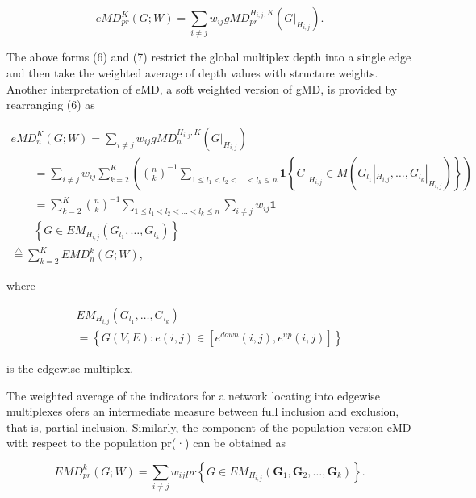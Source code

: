 \documentclass[
  10
]{article}
\begin{document}
\[
e M D _ {p r} ^ {K} (G; W) = \sum_ {i \neq j} w _ {i j} g M D _ {p r} ^ {H _ {i, j}, K} (G | _ {H _ {i, j}}).\tag{7}
\]

The above forms (6) and (7) restrict the global multiplex depth into a
single edge and then take the weighted average of depth values with
structure weights. Another interpretation of eMD, a soft weighted
version of gMD, is provided by rearranging (6) as

\[
\begin{array}{l} e M D _ {n} ^ {K} (G; W) = \sum_ {i \neq j} w _ {i j}   g M D _ {n} ^ {H _ {i, j}, K} (G   | _ {H _ {i, j}}) \\ \qquad = \sum_ {i \neq j} w _ {i j} \sum_ {k = 2} ^ {K} \left(\binom {n} {k} ^ {- 1} \sum_ {1 \leq l _ {1} <   l _ {2} <   \dots <   l _ {k} \leq n} \mathbf {1} \left\{G | _ {H _ {i, j}} \in M \left(G _ {l _ {1}} | _ {H _ {i, j}}, \dots , G _ {l _ {k}} | _ {H _ {i, j}}\right) \right\}\right) \\ \qquad = \sum_ {k = 2} ^ {K} \binom {n} {k} ^ {- 1} \sum_ {1 \leq l _ {1} <   l _ {2} <   \dots <   l _ {k} \leq n} \sum_ {i \neq j} w _ {i j} \mathbf {1} \\ \qquad \left\{G \in E M _ {H _ {i, j}} \left(G _ {l _ {1}}, \dots , G _ {l _ {k}}\right) \right\} \\ \stackrel {{\triangle}} {{=}} \sum_ {k = 2} ^ {K} E M D _ {n} ^ {k} (G; W), \end{array}\tag{8}
\]

where

\[
\begin{array}{l} E M _ {H _ {i, j}} \left(G _ {l _ {1}}, \ldots , G _ {l _ {k}}\right) \\ = \left\{G (V, E): e (i, j) \in \left[ e ^ {d o w n} (i, j), e ^ {u p} (i, j) \right] \right\} \end{array}
\]

is the edgewise multiplex.

The weighted average of the indicators for a network locating into
edgewise multiplexes ofers an intermediate measure between full
inclusion and exclusion, that is, partial inclusion. Similarly, the
component of the population version eMD with respect to the population
pr(·) can be obtained as

\[
E M D _ {p r} ^ {k} (G; W) = \sum_ {i \neq j} w _ {i j} p r \left\{G \in E M _ {H _ {i, j}} \left(\mathbf {G} _ {1}, \mathbf {G} _ {2}, \dots , \mathbf {G} _ {k}\right) \right\}.\tag{9}
\]
\end{document}
